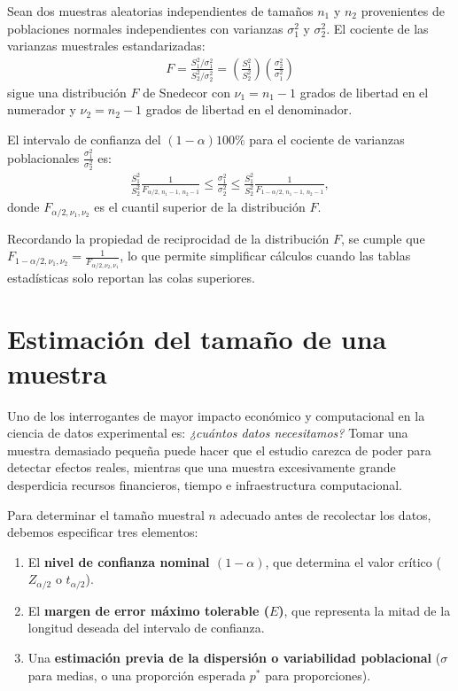 \begin{teorema}
	Sean dos muestras aleatorias independientes de tamaños $n_1$ y $n_2$ provenientes de poblaciones normales independientes con varianzas $\sigma_1^2$ y $\sigma_2^2$. El cociente de las varianzas muestrales estandarizadas:
	\begin{align}
		F = \frac{S_1^2 / \sigma_1^2}{S_2^2 / \sigma_2^2} = \left(\frac{S_1^2}{S_2^2}\right)\left(\frac{\sigma_2^2}{\sigma_1^2}\right)
	\end{align}
	sigue una distribución $F$ de Snedecor con $\nu_1 = n_1 - 1$ grados de libertad en el numerador y $\nu_2 = n_2 - 1$ grados de libertad en el denominador.
	
	El intervalo de confianza del $(1-\alpha)100\%$ para el cociente de varianzas poblacionales $\frac{\sigma_1^2}{\sigma_2^2}$ es:
	\begin{align}
		\frac{S_1^2}{S_2^2} \frac{1}{F_{\alpha/2, \, n_1-1, \, n_2-1}} \leq \frac{\sigma_1^2}{\sigma_2^2} \leq \frac{S_1^2}{S_2^2} \frac{1}{F_{1-\alpha/2, \, n_1-1, \, n_2-1}},
	\end{align}
	donde $F_{\alpha/2, \nu_1, \nu_2}$ es el cuantil superior de la distribución $F$. 
	
	Recordando la propiedad de reciprocidad de la distribución $F$, se cumple que $F_{1-\alpha/2, \nu_1, \nu_2} = \frac{1}{F_{\alpha/2, \nu_2, \nu_1}}$, lo que permite simplificar cálculos cuando las tablas estadísticas solo reportan las colas superiores.
\end{teorema}

\section{Estimación del tamaño de una muestra}

Uno de los interrogantes de mayor impacto económico y computacional en la ciencia de datos experimental es: \emph{¿cuántos datos necesitamos?} Tomar una muestra demasiado pequeña puede hacer que el estudio carezca de poder para detectar efectos reales, mientras que una muestra excesivamente grande desperdicia recursos financieros, tiempo e infraestructura computacional.

Para determinar el tamaño muestral $n$ adecuado antes de recolectar los datos, debemos especificar tres elementos:
\begin{enumerate}
	\item El \textbf{nivel de confianza nominal $(1-\alpha)$}, que determina el valor crítico ($Z_{\alpha/2}$ o $t_{\alpha/2}$).
	\item El \textbf{margen de error máximo tolerable ($E$)}, que representa la mitad de la longitud deseada del intervalo de confianza.
	\item Una \textbf{estimación previa de la dispersión o variabilidad poblacional} ($\sigma$ para medias, o una proporción esperada $p^*$ para proporciones).
\end{enumerate}


